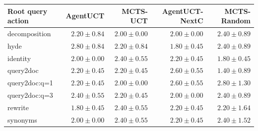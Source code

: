 \begin{tabular}{@{}lrrrr@{}}
\toprule
Root query action & AgentUCT & MCTS-UCT & AgentUCT-NextC & MCTS-Random \\
\midrule
decomposition & $2.20 \pm 0.84$ & $2.00 \pm 0.00$ & $2.00 \pm 0.00$ & $2.40 \pm 0.89$ \\
hyde & $2.80 \pm 0.84$ & $2.20 \pm 0.84$ & $1.80 \pm 0.45$ & $2.40 \pm 0.89$ \\
identity & $2.00 \pm 0.00$ & $2.40 \pm 0.55$ & $2.20 \pm 0.45$ & $1.80 \pm 0.45$ \\
query2doc & $2.20 \pm 0.45$ & $2.20 \pm 0.45$ & $2.60 \pm 0.55$ & $1.40 \pm 0.89$ \\
query2doc:q=1 & $2.20 \pm 0.45$ & $2.00 \pm 0.00$ & $2.60 \pm 0.55$ & $2.80 \pm 1.30$ \\
query2doc:q=3 & $2.40 \pm 0.55$ & $2.20 \pm 0.45$ & $2.00 \pm 0.00$ & $2.40 \pm 0.89$ \\
rewrite & $1.80 \pm 0.45$ & $2.40 \pm 0.55$ & $2.20 \pm 0.45$ & $2.20 \pm 1.64$ \\
synonyms & $2.00 \pm 0.00$ & $2.40 \pm 0.55$ & $2.20 \pm 0.45$ & $2.40 \pm 1.52$ \\
\bottomrule
\end{tabular}
